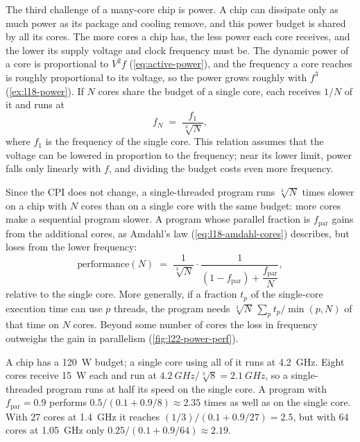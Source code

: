 \documentclass[../main.tex]{subfiles}
\begin{document}
The third challenge of a many-core chip is power.
A chip can dissipate only as much power as its package and cooling remove,
and this power budget is shared by all its cores.  The more cores a chip
has, the less power each core receives, and the lower its supply voltage
and clock frequency must be.  The dynamic power of a core is proportional to
$V^{2}f$ (\cref{eq:active-power}), and the frequency a core reaches is
roughly proportional to its voltage, so the power grows roughly with $f^{3}$
(\cref{ex:l18-power}).  If $N$ cores share the budget of a single core, each
receives $1/N$ of it and runs at
\begin{equation}
  f_{N} \;=\; \frac{f_{1}}{\sqrt[3]{N}} ,
  \label{eq:l22-freq}
\end{equation}
where $f_{1}$ is the frequency of the single core.  This relation assumes
that the voltage can be lowered in proportion to the frequency; near its
lower limit, power falls only linearly with $f$, and dividing the budget
costs even more frequency.

\begin{marginfigure}
  \resizebox{\linewidth}{!}{}
  \caption{Performance of $N$ cores sharing the power budget of one core,
    by \cref{eq:l22-perf}.}
  \label{fig:l22-power-perf}
\end{marginfigure}
Since the CPI does not change, a single-threaded program runs
$\sqrt[3]{N}$ times slower on a chip with $N$ cores than on a single core
with the same budget: more cores make a sequential program slower.  A
program whose parallel fraction is $f_{\mathrm{par}}$ gains from the
additional cores, as Amdahl's law (\cref{eq:l18-amdahl-cores}) describes,
but loses from the lower frequency:
\begin{equation}
  \text{performance}(N) \;=\; \frac{1}{\sqrt[3]{N}}\cdot
  \frac{1}{(1-f_{\mathrm{par}}) + \dfrac{f_{\mathrm{par}}}{N}} ,
  \label{eq:l22-perf}
\end{equation}
relative to the single core.  More generally, if a fraction
$t_{p}$ of the single-core execution time can use $p$ threads, the program needs
$\sqrt[3]{N}\,\sum_{p} t_{p}/\min(p,N)$ of that time on $N$ cores.
Beyond some number of cores the loss in frequency outweighs the gain in
parallelism (\cref{fig:l22-power-perf}).

\begin{example}
  \label{ex:l22-power}
  A chip has a \SI{120}{W} budget; a single core using all of it runs at
  \SI{4.2}{GHz}.  Eight cores receive \SI{15}{W} each and run at
  $\SI{4.2}{GHz}/\sqrt[3]{8}=\SI{2.1}{GHz}$, so a single-threaded program
  runs at half its speed on the single core.  A program with
  $f_{\mathrm{par}}=0.9$ performs $0.5/(0.1+0.9/8)\approx 2.35$ times as well
  as on the single core.  With 27 cores at \SI{1.4}{GHz} it reaches
  $(1/3)/(0.1+0.9/27)=2.5$, but with 64 cores at \SI{1.05}{GHz} only
  $0.25/(0.1+0.9/64)\approx 2.19$.
\end{example}
\end{document}
